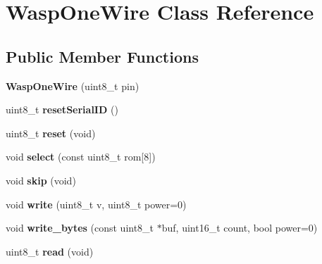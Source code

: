 \hypertarget{class_wasp_one_wire}{}\section{Wasp\+One\+Wire Class Reference}
\label{class_wasp_one_wire}
\subsection*{Public Member Functions}
\begin{DoxyCompactItemize}
\item 
{\bfseries Wasp\+One\+Wire} (uint8\+\_\+t pin)\hypertarget{class_wasp_one_wire_a3a46c1e45302d73a9095bbf8a88c2c76}{}\label{class_wasp_one_wire_a3a46c1e45302d73a9095bbf8a88c2c76}

\item 
uint8\+\_\+t {\bfseries reset\+Serial\+ID} ()\hypertarget{class_wasp_one_wire_ac32297bcf9c7d59ce8ed0b11a76db3d8}{}\label{class_wasp_one_wire_ac32297bcf9c7d59ce8ed0b11a76db3d8}

\item 
uint8\+\_\+t {\bfseries reset} (void)\hypertarget{class_wasp_one_wire_a1e3bc173d73807dbcd887aaf149420ac}{}\label{class_wasp_one_wire_a1e3bc173d73807dbcd887aaf149420ac}

\item 
void {\bfseries select} (const uint8\+\_\+t rom\mbox{[}8\mbox{]})\hypertarget{class_wasp_one_wire_a4e92c8a1b34ee0089b2a6d2ee90d9a04}{}\label{class_wasp_one_wire_a4e92c8a1b34ee0089b2a6d2ee90d9a04}

\item 
void {\bfseries skip} (void)\hypertarget{class_wasp_one_wire_ab10926cc23a071dd10b6ad6c789c7b05}{}\label{class_wasp_one_wire_ab10926cc23a071dd10b6ad6c789c7b05}

\item 
void {\bfseries write} (uint8\+\_\+t v, uint8\+\_\+t power=0)\hypertarget{class_wasp_one_wire_a9ccaa84c638506cf46a2ffecca709fec}{}\label{class_wasp_one_wire_a9ccaa84c638506cf46a2ffecca709fec}

\item 
void {\bfseries write\+\_\+bytes} (const uint8\+\_\+t $\ast$buf, uint16\+\_\+t count, bool power=0)\hypertarget{class_wasp_one_wire_a9d167ffe8a12af36531a69aee774c984}{}\label{class_wasp_one_wire_a9d167ffe8a12af36531a69aee774c984}

\item 
uint8\+\_\+t {\bfseries read} (void)\hypertarget{class_wasp_one_wire_a34a3118a73f1cd36065dee1e9f5bdc3c}{}\label{class_wasp_one_wire_a34a3118a73f1cd36065dee1e9f5bdc3c}


\end{DoxyCompactItemize}
